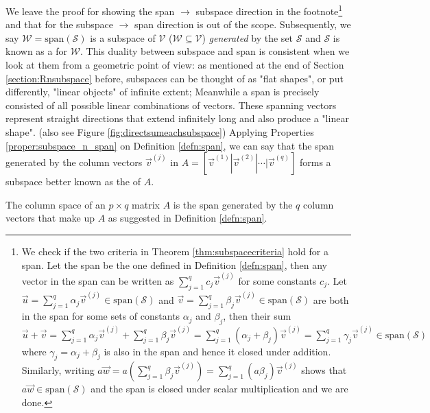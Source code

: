 We leave the proof for showing the span $\rightarrow$ subspace direction in the footnote\footnote{We check if the two criteria in Theorem \ref{thm:subspacecriteria} hold for a span. Let the span be the one defined in Definition \ref{defn:span}, then any vector in the span can be written as $\sum_{j=1}^{q} c_j\vec{v}^{(j)}$ for some constants $c_j$. Let $\vec{u} = \sum_{j=1}^{q} \alpha_j\vec{v}^{(j)} \in \text{span}(\mathcal{S})$ and $\vec{v} = \sum_{j=1}^{q} \beta_j\vec{v}^{(j)} \in \text{span}(\mathcal{S})$ are both in the span for some sets of constants $\alpha_j$ and $\beta_j$, then their sum $\vec{u} + \vec{v} = \sum_{j=1}^{q} \alpha_j\vec{v}^{(j)} + \sum_{j=1}^{q} \beta_j\vec{v}^{(j)} = \sum_{j=1}^{q} (\alpha_j + \beta_j)\vec{v}^{(j)} = \sum_{j=1}^{q} \gamma_j\vec{v}^{(j)} \in \text{span}(\mathcal{S})$ where $\gamma_j = \alpha_j + \beta_j$ is also in the span and hence it closed under addition. Similarly, writing $a\vec{w} = a(\sum_{j=1}^{q} \beta_j\vec{v}^{(j)}) = \sum_{j=1}^{q} (a\beta_j)\vec{v}^{(j)}$ shows that $a\vec{w} \in \text{span}(\mathcal{S})$ and the span is closed under scalar multiplication and we are done.} 
and that for the subspace $\rightarrow$ span direction is out of the scope. Subsequently, we say $\mathcal{W} = \text{span}(\mathcal{S})$ is a subspace of $\mathcal{V}$ ($\mathcal{W} \subseteq \mathcal{V}$) \textit{generated} by the set $\mathcal{S}$ and $\mathcal{S}$ is known as a  for $\mathcal{W}$. This duality between subspace and span is consistent when we look at them from a geometric point of view: as mentioned at the end of Section \ref{section:Rnsubspace} before, subspaces can be thought of as "flat shapes", or put differently, "linear objects" of infinite extent; Meanwhile a span is precisely consisted of all possible linear combinations of vectors. These spanning vectors represent straight directions that extend infinitely long and also produce a "linear shape". (also see Figure \ref{fig:directsumeachsubspace}) Applying Properties \ref{proper:subspace_n_span} on Definition \ref{defn:span}, we can say that the span generated by the column vectors $\vec{v}^{(j)}$ in $A = [\vec{v}^{(1)}|\vec{v}^{(2)}|\cdots|\vec{v}^{(q)}]$ forms a subspace better known as the  of $A$.
\begin{defn}
\label{defn:colspace}
The column space of an $p \times q$ matrix $A$ is the span generated by the $q$ column vectors that make up $A$ as suggested in Definition \ref{defn:span}.
\end{defn}
